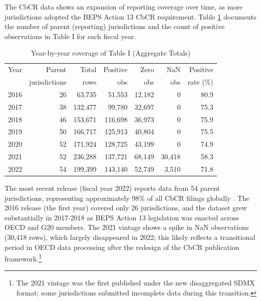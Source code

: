 \documentclass[11pt,a4paper]{article}
\newcommand{\workingnote}[1]{\ifworkingdoc{\textcolor{red}{\textit{[Working note: #1]}}}\fi}
\begin{document}
The CbCR data shows an expansion of reporting coverage over time, as more jurisdictions adopted the BEPS Action 13 CbCR requirement. Table \ref{tab:yearcoverage} documents the number of parent (reporting) jurisdictions and the count of positive observations in Table I for each fiscal year.

\begin{table}[H]
\centering
\caption{Year-by-year coverage of Table I (Aggregate Totals)}
\label{tab:yearcoverage}
\begin{tabular}{@{}lrrrrrr@{}}
\toprule
Year & Parent & Total & Positive & Zero & NaN & Positive \\
 & jurisdictions & rows & obs & obs & obs & rate (\%) \\
\midrule
2016 & 26 & 63,735 & 51,553 & 12,182 & 0 & 80.9 \\
2017 & 38 & 132,477 & 99,780 & 32,697 & 0 & 75.3 \\
2018 & 46 & 153,671 & 116,698 & 36,973 & 0 & 75.9 \\
2019 & 50 & 166,717 & 125,913 & 40,804 & 0 & 75.5 \\
2020 & 52 & 171,924 & 128,725 & 43,199 & 0 & 74.9 \\
2021 & 52 & 236,288 & 137,721 & 68,149 & 30,418 & 58.3 \\
2022 & 54 & 199,399 & 143,140 & 52,749 & 3,510 & 71.8 \\
\bottomrule
\end{tabular}
\end{table}

The most recent release (fiscal year 2022) reports data from 54 parent jurisdictions, representing approximately 98\% of all CbCR filings globally \citep{oecd2025a}. The 2016 release (the first year) covered only 26 jurisdictions, and the dataset grew substantially in 2017-2018 as BEPS Action 13 legislation was enacted across OECD and G20 members. The 2021 vintage shows a spike in NaN observations (30,418 rows), which largely disappeared in 2022; this likely reflects a transitional period in OECD data processing after the redesign of the CbCR publication framework.\footnote{The 2021 vintage was the first published under the new disaggregated SDMX format; some jurisdictions submitted incomplete data during this transition.}

\workingnote{citation}
\end{document}
